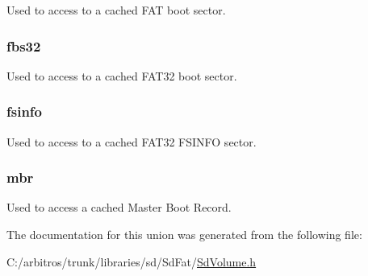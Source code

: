 Used to access to a cached F\-A\-T boot sector. \hypertarget{unioncache__t_a8a286df1a2c7d0d8c19f0bc92f4a37a0}{
\subsubsection[{fbs32}]{ fbs32}}\label{unioncache__t_a8a286df1a2c7d0d8c19f0bc92f4a37a0}
Used to access to a cached F\-A\-T32 boot sector. \hypertarget{unioncache__t_ad5b9c8824c92202c5f442fd4da58772a}{
\subsubsection[{fsinfo}]{ fsinfo}}\label{unioncache__t_ad5b9c8824c92202c5f442fd4da58772a}
Used to access to a cached F\-A\-T32 F\-S\-I\-N\-F\-O sector. \hypertarget{unioncache__t_ab085ad5652aa1dcd3d1c289126acb76e}{
\subsubsection[{mbr}]{ mbr}}\label{unioncache__t_ab085ad5652aa1dcd3d1c289126acb76e}
Used to access a cached Master Boot Record. 

The documentation for this union was generated from the following file\-:\begin{DoxyCompactItemize}
\item 
C\-:/arbitros/trunk/libraries/sd/\-Sd\-Fat/\hyperlink{_sd_volume_8h}{Sd\-Volume.\-h}\end{DoxyCompactItemize}
